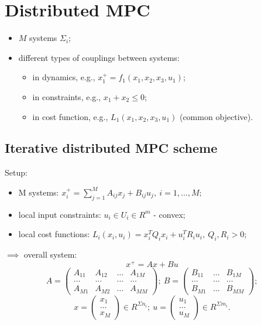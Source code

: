 \section{Distributed MPC}

\begin{itemize}
    \item $M$ systems $\Sigma_i$;
    \item different types of couplings between systems:
    \begin{itemize}
        \item in dynamics, e.g., $x_1^+ = f_1(x_1,x_2,x_3,u_1)$;
        \item in constraints, e.g., $x_1+x_2 \le 0$;
        \item in cost function, e.g., $L_1(x_1,x_2,x_3,u_1)$ (common objective).
    \end{itemize}
\end{itemize}

\subsection{Iterative distributed MPC scheme}

Setup: \begin{itemize}
    \item M systems: $x_i^+ = \sum_{j=1}^M A_{ij}x_j+B_{ij}u_j, \ i=1,...,M;$
    \item local input constraints: $u_i \in U_i \in R^m$ - convex;
    \item local cost functions: $L_i(x_i,u_i) = x_i^TQ_ix_i+u_i^TR_iu_i, \ Q_i,R_i > 0$;
\end{itemize}

$\implies$ overall system:
$$x^+ = Ax+Bu$$
$$A = \begin{pmatrix}
    A_{11} & A_{12} & \dots & A_{1M} \\
    \dots & \dots & \dots & \dots \\
    A_{M1} & A_{M2} & \dots & A_{MM}
    \end{pmatrix}; \ 
B = \begin{pmatrix}
    B_{11} & \dots & B_{1M} \\
    \dots & \dots & \dots \\
    B_{M1} & \dots & B_{MM}
    \end{pmatrix};$$
$$x = \begin{pmatrix}
    x_1 \\
    \dots \\
    x_M
    \end{pmatrix} \in R^{\Sigma n_i}; \ 
u = \begin{pmatrix}
    u_1 \\
    \dots \\
    u_M
    \end{pmatrix} \in R^{\Sigma m_i}.$$\\
    
